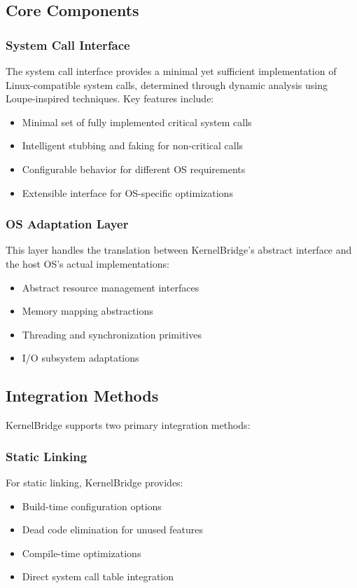 \documentclass[conference]{IEEEtran}
\begin{document}
\subsection{Core Components}
\subsubsection{System Call Interface}
The system call interface provides a minimal yet sufficient implementation of Linux-compatible system calls, determined through dynamic analysis using Loupe-inspired techniques. Key features include:
\begin{itemize}
	\item Minimal set of fully implemented critical system calls
	\item Intelligent stubbing and faking for non-critical calls
	\item Configurable behavior for different OS requirements
	\item Extensible interface for OS-specific optimizations
\end{itemize}

\subsubsection{OS Adaptation Layer}
This layer handles the translation between KernelBridge's abstract interface and the host OS's actual implementations:
\begin{itemize}
	\item Abstract resource management interfaces
	\item Memory mapping abstractions
	\item Threading and synchronization primitives
	\item I/O subsystem adaptations
\end{itemize}

\subsection{Integration Methods}
KernelBridge supports two primary integration methods:

\subsubsection{Static Linking}
For static linking, KernelBridge provides:
\begin{itemize}
	\item Build-time configuration options
	\item Dead code elimination for unused features
	\item Compile-time optimizations
	\item Direct system call table integration
\end{itemize}
\end{document}
